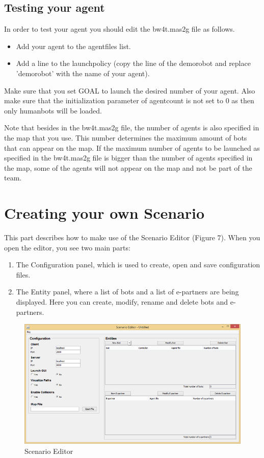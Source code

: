 \documentclass[11pt,a4paper]{article}
\begin{document}
\subsection{Testing your agent}
In order to test your agent you should edit the bw4t.mas2g file as follows.
\begin{itemize}
\item Add your agent to the agentfiles list.
\item Add a line to the launchpolicy (copy the line of the demorobot and replace 'demorobot' with the name of your agent).
\end{itemize}
Make sure that you set GOAL to launch the desired number of your agent. Also make sure that the initialization parameter of agentcount is not set to 0 as then only humanbots will be loaded.

Note that besides in the bw4t.mas2g file, the number of agents is also specified in the map that you use. This number determines the maximum amount of bots that can appear on the map. If the maximum number of agents to be launched as specified in the bw4t.mas2g file is bigger than the number of agents specified in the map, some of the agents will not appear on the map and not be part of the team. 

\section{Creating your own Scenario}
This part describes how to make use of the Scenario Editor (Figure 7). When you open the editor, you see two main parts:
\begin{enumerate}
\item The Configuration panel, which is used to create, open and save configuration files.
\item The Entity panel, where a list of bots and a list of e-partners are being displayed. Here you can create, modify, rename and delete bots and e-partners.
\end{enumerate}

\begin{figure}[h]
\begin{center}
\includegraphics[width=\textwidth]{editor.png}
\caption{Scenario Editor}
\end{center}
\end{figure}
\end{document}
